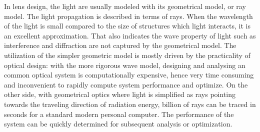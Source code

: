 In lens design, the light are usually modeled with its geometrical model, or ray model. The light propagation is described in terms of rays. When the wavelength of the light is small compared to the size of structures which light interacts, it is an excellent approximation. That also indicates the wave property of light such as interference and diffraction are not captured by the geometrical model. The utilization of the simpler geometric model is mostly driven by the practicality of optical design: with the more rigorous wave model, designing and analysing an common optical system is computationally expensive, hence   very time consuming and inconvenient to rapidly compute system performance and optimize. On the other side, with geometrical optics where light is simplified as rays pointing towards the traveling direction of radiation energy, billion of rays can be traced in seconds for a standard modern personal computer. The performance of the system can be quickly determined for subsequent analysis or optimization.   


 
